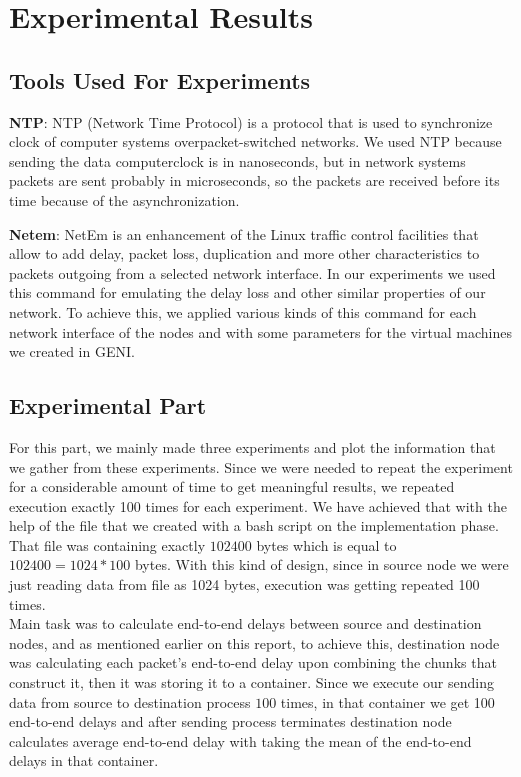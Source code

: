 \documentclass[conference]{IEEEtran}
\begin{document}
\section{Experimental Results}
\subsection{Tools Used For Experiments}
\textbf{NTP}:
NTP (Network Time Protocol) is a protocol that is used to synchronize clock of computer systems overpacket-switched networks. We used NTP because sending the data computerclock is in nanoseconds, but in network systems packets are sent probably in microseconds, so the packets are received before its time because of the asynchronization.

\textbf{Netem}:
NetEm is an enhancement of the Linux traffic control facilities that allow to add delay, packet loss, duplication and more other characteristics to packets outgoing from a selected network interface. In our experiments we used this command for emulating the delay loss and other similar properties of our network. To achieve this, we applied various kinds of this command for each network interface of the nodes and with some parameters for the virtual machines we created in GENI. \\

\subsection{Experimental Part}
For this part, we mainly made three experiments and plot the information that we gather from these experiments. Since we were needed to repeat the experiment for a considerable amount of time to get meaningful results, we repeated execution exactly 100 times for each experiment. We have achieved that with the help of the file that we created with a bash script on the implementation phase. That file was containing exactly $102400$ bytes which is equal to $102400 = 1024 * 100$ bytes. With this kind of design, since in source node we were just reading data from file as 1024 bytes, execution was getting repeated 100 times. \\

Main task was to calculate end-to-end delays between source and destination nodes, and as mentioned earlier on this report, to achieve this, destination node was calculating each packet's end-to-end delay upon combining the chunks that construct it, then it was storing it to a container. Since we execute our sending data from source to destination process $100$ times, in that container we get 100 end-to-end delays and after sending process terminates destination node calculates average end-to-end delay with taking the mean of the end-to-end delays in that container. \\
\end{document}
